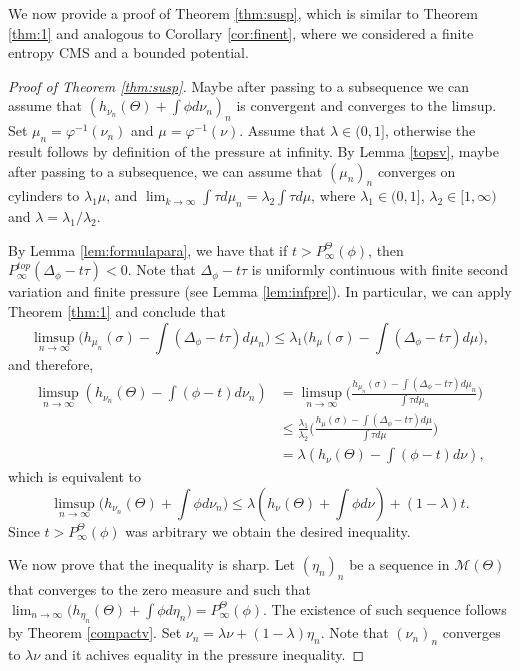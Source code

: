 \documentclass[letterpaper,11pt]{amsart}
\theoremstyle{plain}
\theoremstyle{plain}
\theoremstyle{definition}
\theoremstyle{remark}
\def\M{{\mathcal M}}
\begin{document}
We now provide a proof of Theorem \ref{thm:susp}, which is similar to Theorem \ref{thm:1} and analogous to Corollary \ref{cor:finent}, where we considered a finite entropy CMS and a bounded potential.

\begin{proof}[Proof of Theorem \ref{thm:susp}] Maybe after passing to a subsequence we can assume that $(h_{\nu_n}(\Theta)+\int \phi d\nu_n)_n$ is convergent and converges to the limsup. Set $\mu_n=\varphi^{-1}(\nu_n)$ and $\mu=\varphi^{-1}(\nu)$. Assume that $\lambda\in (0,1]$, otherwise the result follows by definition of the pressure at infinity. By Lemma \ref{topsv}, maybe after passing to a subsequence, we can assume that $(\mu_{n})_n$  converges on cylinders to $\lambda_1\mu$, and $\lim_{k\to\infty}\int \tau d\mu_{n}=\lambda_2\int \tau d\mu$, where $\lambda_1\in (0,1]$, $\lambda_2\in [1,\infty)$ and $\lambda=\lambda_1/\lambda_2$. 

By Lemma \ref{lem:formulapara}, we have that if $t>P_\infty^\Theta(\phi)$, then $P^{top}_\infty(\Delta_\phi-t\tau)<0$. Note that $\Delta_\phi-t\tau$ is uniformly continuous with finite second variation and finite pressure (see Lemma \ref{lem:infpre}). In particular, we can apply Theorem \ref{thm:1} and conclude that 
 $$\limsup_{n\to\infty}\big(h_{\mu_{n}}(\sigma)-\int (\Delta_\phi-t\tau)  d\mu_{n}\big)\le \lambda_1\big(h_{\mu}(\sigma)- \int (\Delta_\phi-t\tau) d\mu\big),$$
and therefore, 
\begin{align*}
\limsup_{n\to\infty} (h_{\nu_n}(\Theta)-\int (\phi-t) d\nu_n)&=\limsup_{n\to\infty}\bigg(\frac{h_{\mu_{n}}(\sigma)-\int (\Delta_\phi-t\tau)  d\mu_{n}}{\int \tau d\mu_{n}}\bigg)\\
&\le \frac{\lambda_1}{\lambda_2}\bigg(\frac{h_{\mu}(\sigma)- \int (\Delta_\phi-t\tau) d\mu}{\int \tau d\mu}\bigg)\\
&=\lambda(h_\nu(\Theta)- \int (\phi-t)d\nu),
\end{align*}
which is equivalent to 
$$\limsup_{n\to\infty} \bigg(h_{\nu_n}(\Theta)+\int \phi d\nu_n\bigg)\le \lambda (h_{\nu}(\Theta)+\int\phi d\nu)+(1-\lambda)t.$$
Since $t>P_\infty^\Theta(\phi)$ was arbitrary we obtain the desired inequality. 

We now prove that the inequality is sharp. Let $(\eta_n)_n$ be a sequence in $\M(\Theta)$ that converges to the zero measure and such that $\lim_{n\to\infty} \big(h_{\eta_n}(\Theta)+\int \phi d\eta_n\big)=P_\infty^\Theta(\phi)$. The existence of such sequence follows by Theorem \ref{compactv}. Set $\nu_n=\lambda\nu+(1-\lambda)\eta_n.$ Note that $(\nu_n)_n$ converges to $\lambda\nu$ and it achives equality in the pressure inequality. 
\end{proof}
\end{document}
